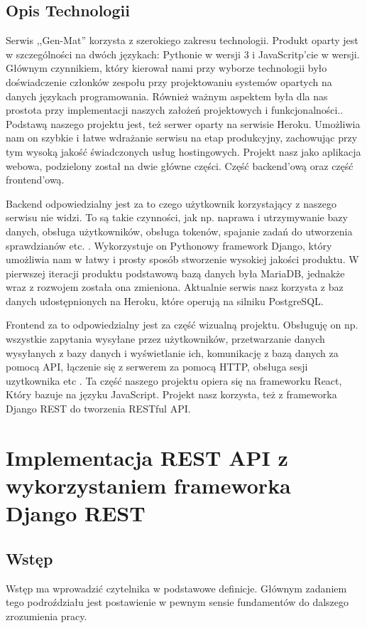 \documentclass[oneside,polski,logo,indent]{amuthesis}
\begin{document}
\section{Opis Technologii}
Serwis ,,Gen-Mat'' korzysta z szerokiego zakresu technologii. Produkt oparty jest w szczególności na dwóch językach: Pythonie w wersji 3 i JavaScritp'cie w wersji. Głównym czynnikiem, który kierował nami przy wyborze technologii było doświadczenie członków zespołu przy projektowaniu systemów opartych na danych językach programowania. Również ważnym aspektem była dla nas prostota przy implementacji naszych założeń projektowych i funkcjonalności.. Podstawą naszego projektu jest, też serwer oparty na serwisie Heroku. Umożliwia nam on szybkie i łatwe wdrażanie serwisu na etap produkcyjny, zachowując przy tym wysoką jakość świadczonych usług hostingowych. Projekt nasz jako aplikacja webowa, podzielony został na dwie główne części. Część backend’ową oraz część frontend’ową.     

Backend odpowiedzialny jest za to czego użytkownik korzystający z naszego serwisu nie widzi. To są takie czynności, jak np. naprawa i utrzymywanie bazy danych, obsługa użytkowników, obsługa tokenów, spajanie zadań do utworzenia sprawdzianów etc. . Wykorzystuje on Pythonowy framework Django, który umożliwia nam w łatwy i prosty sposób stworzenie wysokiej jakości produktu. W pierwszej iteracji produktu podstawową bazą danych była MariaDB, jednakże wraz z rozwojem została ona zmieniona. Aktualnie serwis nasz korzysta z baz danych udostępnionych na Heroku, które operują na silniku PostgreSQL.   

Frontend za to odpowiedzialny jest za część wizualną projektu. Obsługuję on np. wszystkie zapytania wysyłane przez użytkowników, przetwarzanie danych wysyłanych z bazy danych i wyświetlanie ich, komunikację z bazą danych za pomocą API, łączenie się z serwerem za pomocą HTTP, obsługa sesji uzytkownika etc . Ta część naszego projektu opiera się na frameworku React, Który bazuje na języku JavaScript. Projekt nasz korzysta, też z frameworka Django REST do tworzenia RESTful API.

\chapter{Implementacja REST API z wykorzystaniem frameworka Django REST}

\section{Wstęp}
Wstęp ma wprowadzić czytelnika w podstawowe definicje. Głównym zadaniem tego podroździału jest postawienie w pewnym sensie fundamentów do dalszego zrozumienia pracy. 
\end{document}
